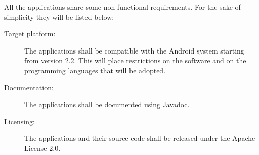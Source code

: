 All the applications share some non functional requirements.
For the sake of simplicity they will be listed below:

\begin{description}
	\item[Target platform:] The applications shall be compatible with the
	Android system starting from version 2.2. This will place restrictions on
	the software and on the programming languages that will be adopted.
	\item[Documentation:] The applications shall be documented using Javadoc.
	\item[Licensing:] The applications and their source code shall be released under the Apache
	License 2.0.
\end{description}
